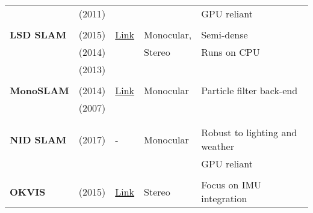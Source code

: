{\begin{longtable}{l|l|l|l|l}
			& \cite{Newcombe2011a} (2011)       &                                                                    &                       & GPU reliant\\
			&                                   &                                                                    &                       &\\
			\textbf{LSD SLAM}      & \cite{Engel2015} (2015)           & {\href{https://github.com/tum-vision/lsd_slam}{Link}}              & Monocular,            & Semi-dense\\
			& \cite{engel14eccv} (2014)           &                                                                    & Stereo                & Runs on CPU\\
			& \cite{engel2013iccv} (2013)           &                                                                    &                       &\\
			&                                   &                                                                    &                       &\\
			\textbf{MonoSLAM}      & \cite{Russo2014} (2014)           & {\href{https://github.com/rrg-polito/mono-slam}{Link}}             & Monocular             & Particle filter back-end\\
			& \cite{Davison2007} (2007)         &                                                                    &                       &\\
			&                                   &                                                                    &                       &\\
			&                                   &                                                                    &                       &\\
			\textbf{NID SLAM}      & \cite{Pascoe2017} (2017)          & -                                                                  & Monocular             & Robust to lighting and weather\\
			&                                   &                                                                    &                       & GPU reliant\\
			&                                   &                                                                    &                       &\\
			\textbf{OKVIS}         & \cite{Leutenegger2015} (2015)     & {\href{https://github.com/ethz-asl/okvis_ros}{Link}}               & Stereo                & Focus on IMU integration\\

\end{longtable}}
